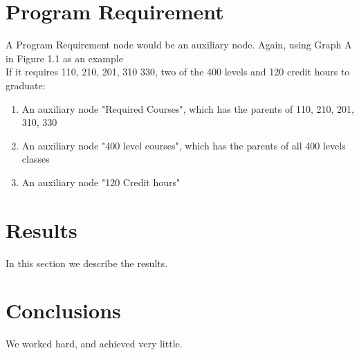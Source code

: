 \documentclass[12pt]{article}
\begin{document}
\section{Program Requirement}
A Program Requirement node would be an auxiliary node. Again, using Graph A in Figure 1.1 as an example\\
If it requires 110, 210, 201, 310 330, two of the 400 levels and 120 credit hours to graduate:
\begin{enumerate}
	\item An auxiliary node "Required Courses", which has the parents of 110, 210, 201, 310, 330
	\item An auxiliary node "400 level courses", which has the parents of all 400 levels classes
	\item An auxiliary node "120 Credit hours"
	
\end{enumerate}

\section{Results}\label{results}
In this section we describe the results.

\section{Conclusions}\label{conclusions}
We worked hard, and achieved very little.



\end{document}

